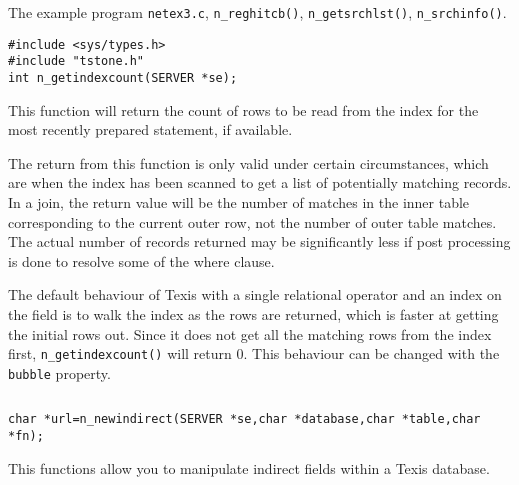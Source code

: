 \SEE
The example program \verb`netex3.c`, \verb`n_reghitcb()`,
\verb`n_getsrchlst()`, \verb`n_srchinfo()`.



\SYNOPSIS
\begin{verbatim}
#include <sys/types.h>
#include "tstone.h"
int n_getindexcount(SERVER *se);
\end{verbatim}

\DESCRIPTION

This function will return the count of rows to be read from the index
for the most recently prepared statement, if available.

\CAVEATS

The return from this function is only valid under certain circumstances,
which are when the index has been scanned to get a list of potentially
matching records.  In a join, the return value will be the number of
matches in the inner table corresponding to the current outer row, not
the number of outer table matches.  The actual number of records returned
may be significantly less if post processing is done to resolve some
of the where clause.

The default behaviour of Texis with a single relational operator and an
index on the field is to walk the index as the rows are returned, which
is faster at getting the initial rows out.  Since it does not get all the
matching rows from the index first, {\tt n\_getindexcount()} will return 0.
This behaviour can be changed with the {\tt bubble} property.

\EXAMPLE
\begin{verbatim}
\end{verbatim}



\SYNOPSIS
\begin{verbatim}
char *url=n_newindirect(SERVER *se,char *database,char *table,char *fn);
\end{verbatim}

\DESCRIPTION

This functions allow you to manipulate indirect fields within
a Texis database.

